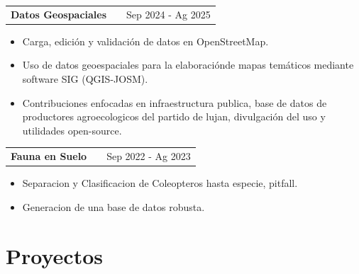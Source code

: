 \documentclass[a4paper,12pt]{article}
\makeatletter
\newenvironment{joblong}[2]
    {
    \begin{tabularx}{\linewidth}{@{}l X r@{}}
    \textbf{#1} & \hfill &  #2 \\[3.75pt]
    \end{tabularx}
    \begin{minipage}[t]{\linewidth}
    \begin{itemize}[nosep,after=\strut, leftmargin=1em, itemsep=3pt,label=--]
    }
    {
    \end{itemize}
    \end{minipage}    
    }
\makeatother
\begin{document}
\begin{joblong}{Datos Geospaciales}{Sep 2024 -  Ag 2025}
\item Carga, edición y validación de datos en
OpenStreetMap.
\item Uso de datos geoespaciales para la
elaboraciónde mapas temáticos mediante
software SIG (QGIS-JOSM).
\item Contribuciones enfocadas en infraestructura
publica, base de datos de productores
agroecologicos del partido de lujan,
divulgación del uso y utilidades open-source.
\end{joblong}

\begin{joblong}{Fauna en Suelo}{Sep 2022 -  Ag 2023}
\item Separacion y Clasificacion de Coleopteros
hasta especie, pitfall.
\item Generacion de una base de datos robusta.
\end{joblong}
  
\section{Proyectos}
\end{document}
